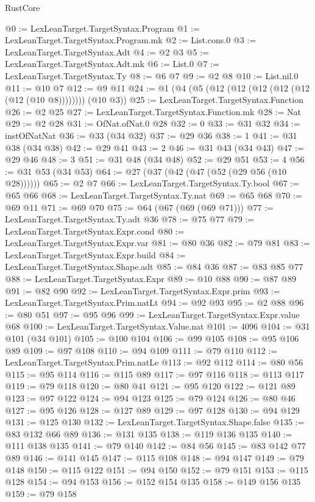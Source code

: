 \begin{lexlean}{RustCore}
\begin{coremodule}
@0 := LexLeanTarget.TargetSyntax.Program
@1 := LexLeanTarget.TargetSyntax.Program.mk
@2 := List.cons.{0}
@3 := LexLeanTarget.TargetSyntax.Adt
@4 := @2 @3
@5 := LexLeanTarget.TargetSyntax.Adt.mk
@6 := List.{0}
@7 := LexLeanTarget.TargetSyntax.Ty
@8 := @6 @7
@9 := @2 @8
@10 := List.nil.{0}
@11 := @10 @7
@12 := @9 @11
@24 := @1 (@4 (@5 (@12 (@12 (@12 (@12 (@12 (@12 (@10 @8)))))))) (@10 @3))
@25 := LexLeanTarget.TargetSyntax.Function
@26 := @2 @25
@27 := LexLeanTarget.TargetSyntax.Function.mk
@28 := Nat
@29 := @2 @28
@31 := OfNat.ofNat.{0} @28
@32 := 0
@33 := @31 @32
@34 := instOfNatNat
@36 := @33 (@34 @32)
@37 := @29 @36
@38 := 1
@41 := @31 @38 (@34 @38)
@42 := @29 @41
@43 := 2
@46 := @31 @43 (@34 @43)
@47 := @29 @46
@48 := 3
@51 := @31 @48 (@34 @48)
@52 := @29 @51
@53 := 4
@56 := @31 @53 (@34 @53)
@64 := @27 (@37 (@42 (@47 (@52 (@29 @56 (@10 @28))))))
@65 := @2 @7
@66 := LexLeanTarget.TargetSyntax.Ty.bool
@67 := @65 @66
@68 := LexLeanTarget.TargetSyntax.Ty.nat
@69 := @65 @68
@70 := @69 @11
@71 := @69 @70
@75 := @64 (@67 (@69 (@69 @71)))
@77 := LexLeanTarget.TargetSyntax.Ty.adt @36
@78 := @75 @77
@79 := LexLeanTarget.TargetSyntax.Expr.cond
@80 := LexLeanTarget.TargetSyntax.Expr.var
@81 := @80 @36
@82 := @79 @81
@83 := LexLeanTarget.TargetSyntax.Expr.build
@84 := LexLeanTarget.TargetSyntax.Shape.adt
@85 := @84 @36
@87 := @83 @85 @77
@88 := LexLeanTarget.TargetSyntax.Expr
@89 := @10 @88
@90 := @87 @89
@91 := @82 @90
@92 := LexLeanTarget.TargetSyntax.Expr.prim
@93 := LexLeanTarget.TargetSyntax.Prim.natLt
@94 := @92 @93
@95 := @2 @88
@96 := @80 @51
@97 := @95 @96
@99 := LexLeanTarget.TargetSyntax.Expr.value @68
@100 := LexLeanTarget.TargetSyntax.Value.nat
@101 := 4096
@104 := @31 @101 (@34 @101)
@105 := @100 @104
@106 := @99 @105
@108 := @95 @106 @89
@109 := @97 @108
@110 := @94 @109
@111 := @79 @110
@112 := LexLeanTarget.TargetSyntax.Prim.natLe
@113 := @92 @112
@114 := @80 @56
@115 := @95 @114
@116 := @115 @89
@117 := @97 @116
@118 := @113 @117
@119 := @79 @118
@120 := @80 @41
@121 := @95 @120
@122 := @121 @89
@123 := @97 @122
@124 := @94 @123
@125 := @79 @124
@126 := @80 @46
@127 := @95 @126
@128 := @127 @89
@129 := @97 @128
@130 := @94 @129
@131 := @125 @130
@132 := LexLeanTarget.TargetSyntax.Shape.false
@135 := @83 @132 @66 @89
@136 := @131 @135
@138 := @119 @136 @135
@140 := @111 @138 @135
@141 := @79 @140
@142 := @84 @56
@145 := @83 @142 @77 @89
@146 := @141 @145
@147 := @115 @108
@148 := @94 @147
@149 := @79 @148
@150 := @115 @122
@151 := @94 @150
@152 := @79 @151
@153 := @115 @128
@154 := @94 @153
@156 := @152 @154 @135
@158 := @149 @156 @135
@159 := @79 @158

\end{coremodule}
\end{lexlean}
